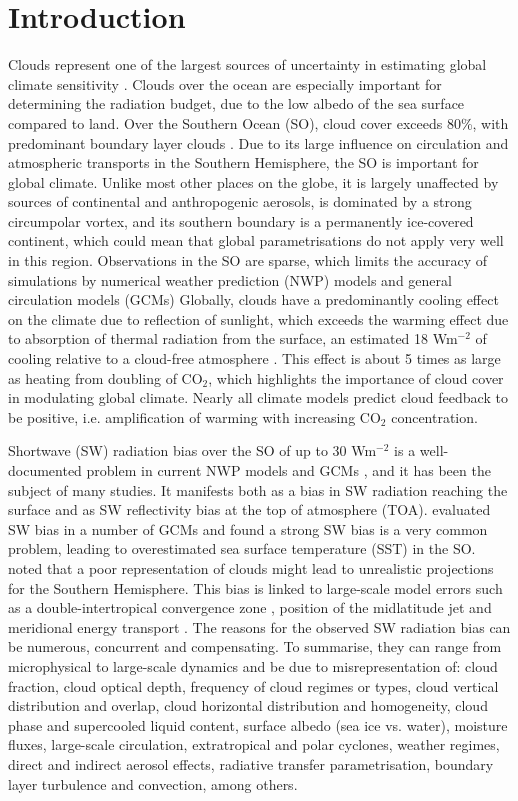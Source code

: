 \chapter{Introduction}

Clouds represent one of the largest sources of uncertainty in estimating global
climate sensitivity \citep{williams2017}. Clouds over the ocean
are especially important for determining the radiation budget, due to the
low albedo of the sea surface compared to land.
Over the Southern Ocean (SO),
cloud cover exceeds 80\%, with predominant boundary layer clouds \citep{mace2009}.
Due to its large influence on circulation and atmospheric transports in the
Southern Hemisphere, the SO is important for global climate. Unlike
most other places on the globe, it is largely unaffected by sources of
continental and anthropogenic aerosols, is dominated by a strong circumpolar
vortex, and its southern boundary is a permanently ice-covered continent,
which could mean that global parametrisations do not apply very well in this
region. Observations in the SO are sparse, which limits the accuracy
of simulations by numerical weather prediction (NWP) models and general
circulation models (GCMs)
Globally, clouds have a predominantly cooling effect on the climate due to reflection
of sunlight, which exceeds the warming effect due to absorption of thermal
radiation from the surface, an estimated 18 Wm$^{-2}$ of cooling relative to a cloud-free atmosphere
\citep{zelinka2017}. This effect is about 5 times as large as heating from
doubling of CO$_2$, which highlights the importance of cloud cover in modulating
global climate. Nearly all climate models predict cloud feedback to be positive,
i.e. amplification of warming with increasing CO$_2$ concentration.

Shortwave (SW) radiation bias over the SO of up to 30 Wm$^{-2}$ is a
well-documented problem in current NWP models and GCMs
\citep{trenberth2010}, and it has been the subject of many studies.
It manifests both as a bias in SW radiation reaching the surface and as
SW reflectivity bias at the top of atmosphere (TOA).
\cite{bodas-salcedo2014} evaluated SW bias in a number
of GCMs and found a strong SW bias is a very common problem, leading to
overestimated sea surface temperature (SST) in the SO.
\cite{trenberth2010} noted that a poor representation of clouds might lead to
unrealistic projections for the Southern Hemisphere. This bias is linked to
large-scale model errors such as a double-intertropical
convergence zone \citep{hwang2013}, position of the midlatitude jet and
meridional energy transport \citep{mason2014}.
The reasons for the observed SW radiation bias
can be numerous, concurrent and compensating. To summarise, they can range
from microphysical to large-scale dynamics and be due to misrepresentation of:
cloud fraction, cloud optical depth, frequency of cloud regimes or types,
cloud vertical distribution and overlap, cloud horizontal distribution
and homogeneity, cloud phase and supercooled liquid content, surface albedo
(sea ice vs. water), moisture fluxes, large-scale circulation, extratropical
and polar cyclones, weather regimes, direct and indirect aerosol effects,
radiative transfer parametrisation, boundary layer turbulence and convection,
among others.

